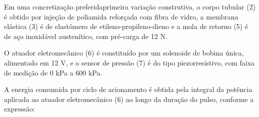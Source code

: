 
\secaoinpi{\secaodasconcretizacoes}

\pnum Em uma \ifinvencao concretização preferida\else primeira variação
construtiva\fi, o corpo tubular (2) é obtido por injeção de poliamida reforçada
com fibra de vidro, a membrana elástica (3) é de elastômero de
etileno-propileno-dieno e a mola de retorno (5) é de aço inoxidável austenítico,
com pré-carga de 12 N.

\pnum O atuador eletromecânico (6) é constituído por um solenoide de bobina
única, alimentado em 12 V, e o sensor de pressão (7) é do tipo piezorresistivo,
com faixa de medição de 0 kPa a 600 kPa.

\pnum A energia consumida por ciclo de acionamento é obtida pela integral da
potência aplicada ao atuador eletromecânico (6) ao longo da duração do pulso,
conforme a expressão:

